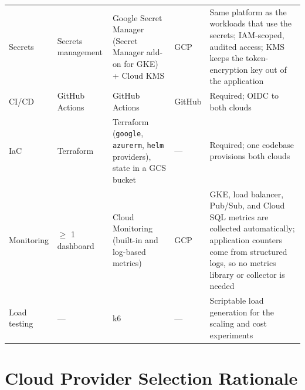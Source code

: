 \documentclass[conference]{IEEEtran}
\begin{document}
\begin{table}[!t]
\begin{tabularx}{\textwidth}{@{}L{2.0cm}L{2.6cm}L{3.6cm}L{1.1cm}Y@{}}
Secrets & Secrets management & Google Secret Manager (Secret Manager add-on for GKE) + Cloud KMS & GCP & Same platform as the workloads that use the secrets; IAM-scoped, audited access; KMS keeps the token-encryption key out of the application \\
CI/CD & GitHub Actions & GitHub Actions & GitHub & Required; OIDC to both clouds \\
IaC & Terraform & Terraform (\texttt{google}, \texttt{azurerm}, \texttt{helm} providers), state in a GCS bucket & --- & Required; one codebase provisions both clouds \\
Monitoring & $\geq$ 1 dashboard & Cloud Monitoring (built-in and log-based metrics) & GCP & GKE, load balancer, Pub/Sub, and Cloud SQL metrics are collected automatically; application counters come from structured logs, so no metrics library or collector is needed \\
Load testing & --- & k6 & --- & Scriptable load generation for the scaling and cost experiments \\
\bottomrule
\end{tabularx}
\end{table}

\section{Cloud Provider Selection Rationale}
\end{document}
